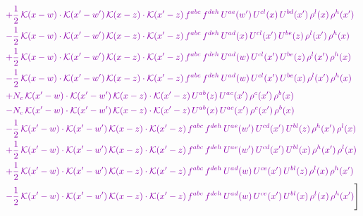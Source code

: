 \documentclass[10pt]{article}
\numberwithin{equation}{section}
\begin{document}
\begin{align}
&{\color{CC} +\frac{1}{2}\,\mathcal{K}(x-w)\cdot\mathcal{K}(x'-w')\,\mathcal{K}(x-z)\cdot\mathcal{K}(x'-z)\,f^{abc}\,f^{deh}\,U^{ae}(w')\,U^{cl}(x)\,U^{bd}(x')\,\rho^{l}(x)\,\rho^{h}(x')} \notag\\
&{\color{CC} -\frac{1}{2}\,\mathcal{K}(x-w)\cdot\mathcal{K}(x'-w')\,\mathcal{K}(x-z)\cdot\mathcal{K}(x'-z)\,f^{abc}\,f^{deh}\,U^{ad}(x)\,U^{cl}(x')\,U^{be}(z)\,\rho^{l}(x')\,\rho^{h}(x)} \notag\\
&{\color{CC} +\frac{1}{2}\,\mathcal{K}(x-w)\cdot\mathcal{K}(x'-w')\,\mathcal{K}(x-z)\cdot\mathcal{K}(x'-z)\,f^{abc}\,f^{deh}\,U^{ad}(w)\,U^{cl}(x')\,U^{be}(z)\,\rho^{l}(x')\,\rho^{h}(x)} \notag\\
&{\color{CC} -\frac{1}{2}\,\mathcal{K}(x-w)\cdot\mathcal{K}(x'-w')\,\mathcal{K}(x-z)\cdot\mathcal{K}(x'-z)\,f^{abc}\,f^{deh}\,U^{ad}(w)\,U^{cl}(x')\,U^{be}(x)\,\rho^{l}(x')\,\rho^{h}(x)} \notag\\
&{\color{CC} +N_{c}\,\mathcal{K}(x'-w)\cdot\mathcal{K}(x'-w')\,\mathcal{K}(x-z)\cdot\mathcal{K}(x'-z)\,U^{ab}(z)\,U^{ac}(x')\,\rho^{c}(x')\,\rho^{b}(x)} \notag\\
&{\color{CC} -N_{c}\,\mathcal{K}(x'-w)\cdot\mathcal{K}(x'-w')\,\mathcal{K}(x-z)\cdot\mathcal{K}(x'-z)\,U^{ab}(x)\,U^{ac}(x')\,\rho^{c}(x')\,\rho^{b}(x)} \notag\\
&{\color{CC} -\frac{1}{2}\,\mathcal{K}(x'-w)\cdot\mathcal{K}(x'-w')\,\mathcal{K}(x-z)\cdot\mathcal{K}(x'-z)\,f^{abc}\,f^{deh}\,U^{ae}(w')\,U^{cd}(x')\,U^{bl}(z)\,\rho^{h}(x')\,\rho^{l}(x)} \notag\\
&{\color{CC} +\frac{1}{2}\,\mathcal{K}(x'-w)\cdot\mathcal{K}(x'-w')\,\mathcal{K}(x-z)\cdot\mathcal{K}(x'-z)\,f^{abc}\,f^{deh}\,U^{ae}(w')\,U^{cd}(x')\,U^{bl}(x)\,\rho^{h}(x')\,\rho^{l}(x)} \notag\\
&{\color{CC} +\frac{1}{2}\,\mathcal{K}(x'-w)\cdot\mathcal{K}(x'-w')\,\mathcal{K}(x-z)\cdot\mathcal{K}(x'-z)\,f^{abc}\,f^{deh}\,U^{ad}(w)\,U^{ce}(x')\,U^{bl}(z)\,\rho^{l}(x)\,\rho^{h}(x')} \notag\\
&{\color{CC} -\frac{1}{2}\,\mathcal{K}(x'-w)\cdot\mathcal{K}(x'-w')\,\mathcal{K}(x-z)\cdot\mathcal{K}(x'-z)\,f^{abc}\,f^{deh}\,U^{ad}(w)\,U^{ce}(x')\,U^{bl}(x)\,\rho^{l}(x)\,\rho^{h}(x')}\Bigg] \end{align}
\end{document}
